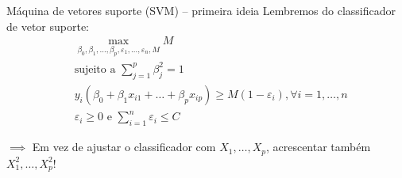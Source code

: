 

\begin{frame}{Máquina de vetores suporte (SVM) -- primeira ideia}
    Lembremos do classificador de vetor suporte:
    \begin{align*}
        &\max_{\beta_0, \beta_1, \dots, \beta_p, \varepsilon_1, \dots, \varepsilon_n, M} M \\ 
        &\text{sujeito a } \sum_{j = 1}^{p} \beta_j^2 = 1 \\
        &y_i(\beta_0 + \beta_1 x_{i1} + \dots + \beta_p x_{ip}) \geq M(1 - \varepsilon_i), \forall i = 1, \dots, n \\
        &\varepsilon_i \geq 0 \text{ e } \sum_{i = 1}^{n} \varepsilon_i \leq C
    \end{align*}
    
    \pause
    
    \begin{center}
        $\implies$ Em vez de ajustar o classificador com $X_1, \dots, X_p$, acrescentar também $X_1^2, \dots, X_p^2$!
    \end{center}
\end{frame}



